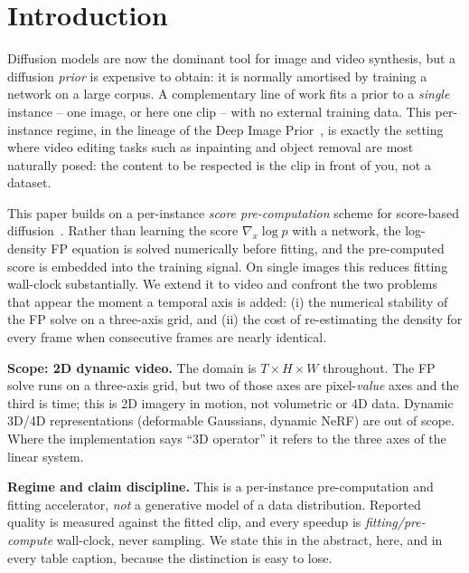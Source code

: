 \section{Introduction}

Diffusion models are now the dominant tool for image and video synthesis, but a
diffusion \emph{prior} is expensive to obtain: it is normally amortised by
training a network on a large corpus. A complementary line of work fits a prior
to a \emph{single} instance -- one image, or here one clip -- with no external
training data. This per-instance regime, in the lineage of the Deep Image
Prior~\cite{ulyanov-2018-dip}, is exactly the setting where video editing tasks
such as inpainting and object removal are most naturally posed: the content to
be respected is the clip in front of you, not a dataset.

This paper builds on a per-instance \emph{score pre-computation} scheme for
score-based diffusion~\cite{ysong-2020}. Rather than learning the score
$\nabla_x\log p$ with a network, the log-density FP equation is solved
numerically before fitting, and the pre-computed score is embedded into the
training signal. On single images this reduces fitting wall-clock
substantially. We extend it to video and confront the two problems that
appear the moment a temporal axis is added: (i) the numerical stability of the
FP solve on a three-axis grid, and (ii) the cost of re-estimating the density
for every frame when consecutive frames are nearly identical.

\medskip\noindent\textbf{Scope: 2D dynamic video.} The domain is
$T\times H\times W$ throughout. The FP solve runs on a three-axis grid, but two
of those axes are pixel-\emph{value} axes and the third is time; this is 2D
imagery in motion, not volumetric or 4D data. Dynamic 3D/4D representations
(deformable Gaussians, dynamic NeRF) are out of scope. Where the implementation
says ``3D operator'' it refers to the three axes of the linear system.

\medskip\noindent\textbf{Regime and claim discipline.} This is a per-instance
pre-computation and fitting accelerator, \emph{not} a generative model of a data
distribution. Reported quality is measured against the fitted clip, and every
speedup is \emph{fitting/pre-compute} wall-clock, never sampling. We state this
in the abstract, here, and in every table caption, because the distinction is
easy to lose.


